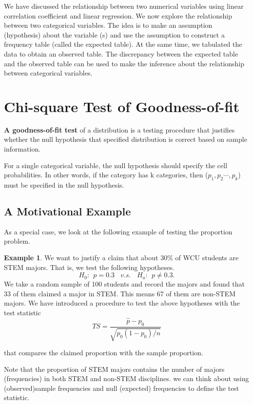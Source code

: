\documentclass[
]{book}
\begin{document}
We have discussed the relationship between two numerical variables using linear correlation coefficient and linear regression. We now explore the relationship between two categorical variables. The idea is to make an assumption (hypothesis) about the variable (s) and use the assumption to construct a frequency table (called the expected table). At the same time, we tabulated the data to obtain an observed table. The discrepancy between the expected table and the observed table can be used to make the inference about the relationship between categorical variables.

\hypertarget{chi-square-test-of-goodness-of-fit}{%
\section{Chi-square Test of Goodness-of-fit}\label{chi-square-test-of-goodness-of-fit}}

\textbf{A goodness-of-fit test} of a distribution is a testing procedure that justifies whether the null hypothesis that specified distribution is correct based on sample information.

For a single categorical variable, the null hypothesis should specify the cell probabilities. In other words, if the category has k categories, then (\(p_1, p_2 \cdots, p_k\)) must be specified in the null hypothesis.

\hypertarget{a-motivational-example}{%
\subsection{A Motivational Example}\label{a-motivational-example}}

As a special case, we look at the following example of testing the proportion problem.

\textbf{Example 1}. We want to justify a claim that about 30\% of WCU students are STEM majors. That is, we test the following hypotheses.
\[
H_0: \  \ p = 0.3 \ \ \ \ v.s. \ \ \ \ H_a: \ \ p \ne 0.3.
\]
We take a random sample of 100 students and record the majors and found that 33 of them claimed a major in STEM. This means 67 of them are non-STEM majors. We have introduced a procedure to test the above hypotheses with the test statistic
\[
TS = \frac{\hat{p}-p_0}{\sqrt{p_0(1-p_0)/n}}
\]

that compares the claimed proportion with the sample proportion.

Note that the proportion of STEM majors contains the number of majors (frequencies) in both STEM and non-STEM disciplines. we can think about using (observed)sample frequencies and null (expected) frequencies to define the test statistic.
\end{document}
